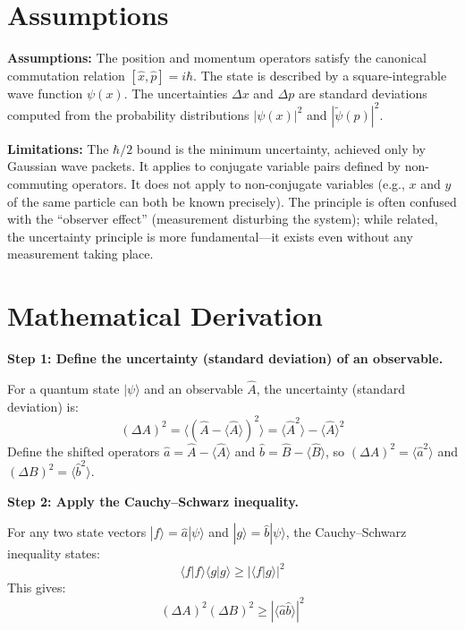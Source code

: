 \section*{Assumptions}

\textbf{Assumptions:} The position and momentum operators satisfy the canonical commutation relation $[\hat{x},\hat{p}] = i\hbar$. The state is described by a square-integrable wave function $\psi(x)$. The uncertainties $\Delta x$ and $\Delta p$ are standard deviations computed from the probability distributions $|\psi(x)|^2$ and $|\tilde{\psi}(p)|^2$.


\textbf{Limitations:} The $\hbar/2$ bound is the minimum uncertainty, achieved only by Gaussian wave packets. It applies to conjugate variable pairs defined by non-commuting operators. It does not apply to non-conjugate variables (e.g., $x$ and $y$ of the same particle can both be known precisely). The principle is often confused with the ``observer effect'' (measurement disturbing the system); while related, the uncertainty principle is more fundamental---it exists even without any measurement taking place.


\section*{Mathematical Derivation}

\textbf{Step 1: Define the uncertainty (standard deviation) of an observable.}

For a quantum state $|\psi\rangle$ and an observable $\hat{A}$, the uncertainty (standard deviation) is:
\begin{equation}
(\Delta A)^2 = \langle(\hat{A}-\langle\hat{A}\rangle)^2\rangle = \langle\hat{A}^2\rangle - \langle\hat{A}\rangle^2
\end{equation}
Define the shifted operators $\hat{a} = \hat{A} - \langle\hat{A}\rangle$ and $\hat{b} = \hat{B} - \langle\hat{B}\rangle$, so $(\Delta A)^2 = \langle\hat{a}^2\rangle$ and $(\Delta B)^2 = \langle\hat{b}^2\rangle$.

\textbf{Step 2: Apply the Cauchy--Schwarz inequality.}

For any two state vectors $|f\rangle = \hat{a}|\psi\rangle$ and $|g\rangle = \hat{b}|\psi\rangle$, the Cauchy--Schwarz inequality states:
\begin{equation}
\langle f|f\rangle\langle g|g\rangle \geq |\langle f|g\rangle|^2
\end{equation}
This gives:
\begin{equation}
(\Delta A)^2(\Delta B)^2 \geq |\langle\hat{a}\hat{b}\rangle|^2
\end{equation}

